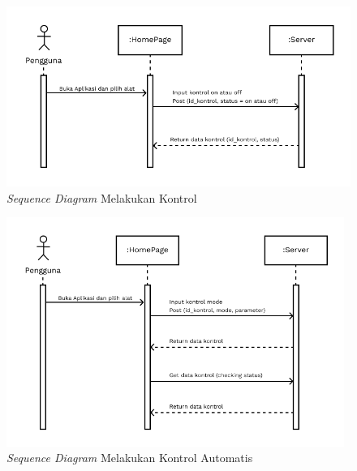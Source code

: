 \begin{flushleft}
\begin{justify}
\begin{enumerate}[label=\alph*.]
            \begin{figure}[ht]
                \centering
                \includegraphics[width=14cm]{images/bab 4/Sequence kontrol.png}
                \caption{\textit{Sequence Diagram} Melakukan Kontrol}
            \end{figure}
            \begin{figure}[ht]
                \centering
                \includegraphics[width=11cm]{images/bab 4/Sequence kontrol Auto.png}
                \caption{\textit{Sequence Diagram} Melakukan Kontrol Automatis}
            \end{figure}
            \end{enumerate}
            \noindent \\\\\\\\\\\\\\\\

\end{justify}
\end{flushleft}
